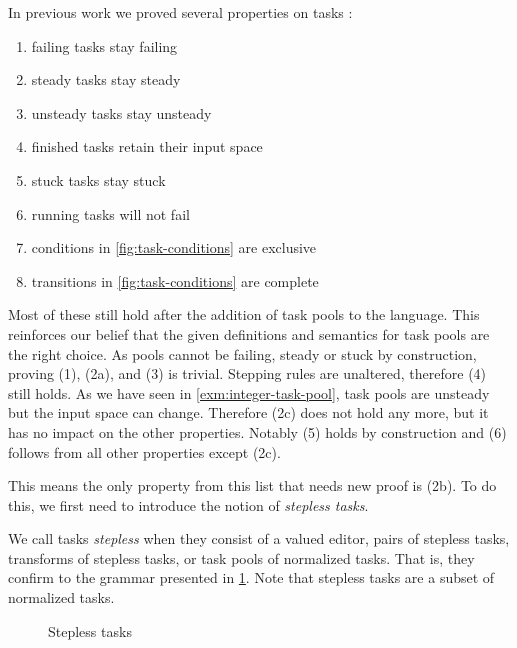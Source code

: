 In previous work we proved several properties on tasks \cite{conf/sfp/KlijnsmaS22,Steenvoorden22}:
\begin{enumerate}
  \item[(1)] failing tasks stay failing
  \item[(2a)] steady tasks stay steady
  \item[(2b)] unsteady tasks stay unsteady
  \item[(2c)] finished tasks retain their input space
  \item[(3)] stuck tasks stay stuck
  \item[(4)] running tasks will not fail
  \item[(5)] conditions in \cref{fig:task-conditions} are exclusive
  \item[(6)] transitions in \cref{fig:task-conditions} are complete
\end{enumerate}
Most of these still hold after the addition of task pools to the language.
This reinforces our belief that the given definitions and semantics for task pools are the right choice.
As pools cannot be failing, steady or stuck by construction,
proving (1), (2a), and (3) is trivial.
Stepping rules are unaltered, therefore (4) still holds.
As we have seen in \cref{exm:integer-task-pool},
task pools are unsteady but the input space can change.
Therefore (2c) does not hold any more,
but it has no impact on the other properties.
Notably (5) holds by construction and (6) follows from all other properties except (2c).

This means the only property from this list that needs new proof is (2b).
To do this, we first need to introduce the notion of \emph{stepless tasks}.

\begin{definition}
  \label{def:stepless-task}
  We call tasks \emph{stepless} when they consist of
  a valued editor,
  pairs of stepless tasks,
  transforms of stepless tasks,
  or task pools of normalized tasks.
  That is, they confirm to the grammar presented in \cref{fig:stepless-tasks-grammar}.
  Note that stepless tasks are a subset of normalized tasks.
\end{definition}

\begin{figure}
  \label{fig:stepless-tasks-grammar}
  \caption{Stepless tasks}
\end{figure}

